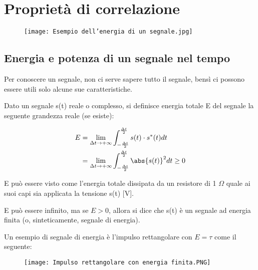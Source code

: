 \chapter{Proprietà di correlazione}

\begin{figure}[h]
    \centering
    \texttt{[image: Esempio dell'energia di un segnale.jpg]}
\end{figure}  

\newpage 

\section{Energia e potenza di un segnale nel tempo}

Per conoscere un segnale, non ci serve sapere tutto il segnale, bensì ci possono essere utili 
solo alcune sue caratteristiche. \newline 

Dato un segnale s(t) reale o complesso, si definisce energia 
totale E del segnale la seguente grandezza reale (se esiste): 

{
    \Large 
    \begin{equation}
        \begin{split}
            E 
            &=
            \lim_{\Delta t \rightarrow + \infty} 
            \int_{- \frac{\Delta t}{2}}^{\frac{\Delta t}{2}}
            s(t) \cdot s^{*}(t) dt 
            \\
            &=  \lim_{\Delta t \rightarrow + \infty} 
            \int_{- \frac{\Delta t}{2}}^{\frac{\Delta t}{2}}
            \abs{s(t)}^{2} dt \geq 0
        \end{split}
    \end{equation}
}

E può essere visto come l'energia totale dissipata da un resistore di 1 $\Omega$ quale ai suoi 
capi sia applicata la tensione s(t) [V]. \newline 

E può essere infinito, ma se $E>0$, allora si dice che s(t) è un segnale ad energia finita (o, sinteticamente, segnale di energia). \newline 

Un esempio di segnale di energia è l'impulso rettangolare con $E= \tau$ come il seguente: 

\begin{figure}[h]
    \centering
    \texttt{[image: Impulso rettangolare con energia finita.PNG]}
\end{figure}  

